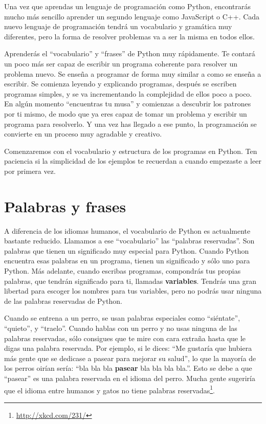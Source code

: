 Una vez que aprendas un lenguaje de programación como Python, encontrarás
mucho más sencillo aprender un segundo lenguaje como JavaScript o C++.
Cada nuevo lenguaje de programación tendrá un vocabulario y gramática muy
diferentes, pero la forma de resolver problemas
va a ser la misma en todos ellos.

Aprenderás el ``vocabulario'' y ``frases'' de Python muy rápidamente.
Te contará un poco más ser capaz de escribir un programa coherente
para resolver un problema nuevo. Se enseña a programar de forma muy similar
a como se enseña a escribir. Se comienza leyendo y explicando programas,
después se escriben programas simples, y se va incrementando la complejidad
de ellos poco a poco. En algún momento ``encuentras tu musa'' y comienzas
a descubrir los patrones por ti mismo, de modo que ya eres capaz de tomar un
problema y escribir un programa para resolverlo. Y una vez has llegado a ese
punto, la programación se convierte en un proceso muy agradable y creativo.

Comenzaremos con el vocabulario y estructura de los programas en Python. Ten
paciencia si la simplicidad de los ejemplos te recuerdan a cuando empezaste
a leer por primera vez.

\section{Palabras y frases}

A diferencia de los idiomas humanos, el vocabulario de Python es actualmente
bastante reducido. Llamamos a ese ``vocabulario'' las ``palabras reservadas''.
Son palabras que tienen un significado muy especial para Python. Cuando Python
encuentra esas palabras en un programa, tienen un significado y sólo uno para Python.
Más adelante, cuando escribas programas, compondrás tus propias palabras, que tendrán significado para ti, llamadas {\bf variables}. Tendrás una gran libertad para escoger los nombres para tus variables, pero no podrás usar ninguna de las palabras reservadas de Python.

Cuando se entrena a un perro, se usan palabras especiales como
``siéntate'', ``quieto'', y ``traelo''. Cuando hablas con un perro y
no usas ninguna de las palabras reservadas, sólo consigues que te mire
con cara extraña hasta que le digas una palabra reservada.
Por ejemplo, si le dices:
``Me gustaría que hubiera más gente que se dedicase a pasear para mejorar su salud'',
lo que la mayoría de los perros oirían sería:
``bla bla bla {\bf pasear} bla bla bla bla.''.
Esto se debe a que ``pasear'' es una palabra reservada en el idioma del perro.
Mucha gente sugeriría que el idioma entre humanos y gatos no tiene
palabras reservadas\footnote{\url{http://xkcd.com/231/}}.

